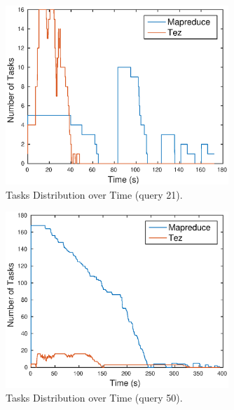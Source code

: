 \documentclass[10pt]{article}
\begin{document}
\begin{figure}
\begin{center}
\includegraphics[width=0.75\textwidth]{pic/q1c_task_distribution_21}
\caption{Tasks Distribution over Time (query 21).}
\label{fig:q1c_tasks_21}
\end{center}
\end{figure}

\begin{figure}
\begin{center}
\includegraphics[width=0.75\textwidth]{pic/q1c_task_distribution_50}
\caption{Tasks Distribution over Time (query 50).}
\label{ffig:q1c_tasks_50}
\end{center}
\end{figure}
\end{document}
